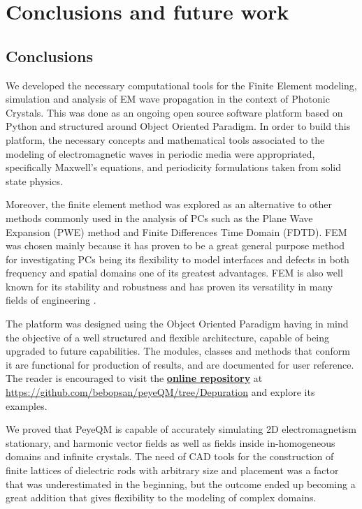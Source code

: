 \chapter{Conclusions and future work}

\section{Conclusions}

We developed the necessary computational tools for the Finite Element modeling, simulation and analysis of EM wave propagation in the context of Photonic Crystals.  This was done as an ongoing open source software platform based on Python and structured around Object Oriented Paradigm. 
In order to build this platform, the necessary concepts and mathematical tools associated to the modeling of electromagnetic waves in periodic media were appropriated, specifically Maxwell's equations, and periodicity formulations taken from solid state physics. 

Moreover, the finite element method was explored as an alternative to other methods commonly used in the analysis of PCs such as the Plane Wave Expansion (PWE) \cite{StevenJohnson2001} method\add[SEC]{,} and Finite Differences Time Domain (FDTD)\cite{Oskooi2009}. FEM was chosen mainly because it has proven to be a great general purpose method for investigating PCs \cite{Andonegui2013} being its flexibility to model interfaces and defects in both frequency and spatial domains one of its greatest advantages. FEM is also well known for its stability and robustness and has proven its versatility in many fields of engineering \cite{Bathe1996, Ram2002, Zienkiewicz2005, Logg2012}.

The platform was designed using the Object Oriented Paradigm having in mind the objective of  a well structured and flexible architecture, capable of being upgraded to future capabilities.  The modules, classes and methods that conform it are functional for production of results, and are documented for user reference. The reader is encouraged to visit the \href{https://github.com/bebopsan/peyeQM/tree/Depuration}{\textbf{online repository}} at \url{https://github.com/bebopsan/peyeQM/tree/Depuration}  and explore its examples.

We proved that PeyeQM is capable of accurately simulating  2D electromagnetism stationary, and harmonic vector fields as well as fields inside in-homogeneous domains and infinite crystals. The need of CAD tools for the construction of finite lattices of dielectric rods with arbitrary size and placement was a factor that was underestimated in the beginning, but the outcome ended up becoming a great addition that gives flexibility to the modeling of complex domains.

